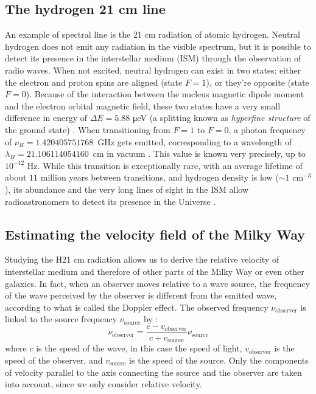 \subsection{The hydrogen 21 cm line}
An example of spectral line is the 21 cm radiation of atomic hydrogen.
Neutral hydrogen does not emit any radiation in the visible spectrum, but it is possible to detect its presence in the interstellar medium (ISM) through the observation of radio waves.
When not excited, neutral hydrogen can exist in two states: either the electron and proton spins are aligned (state $F=1$), or they're opposite (state $F=0$).
Because of the interaction between the nucleus magnetic dipole moment and the electron orbital magnetic field, these two states have a very small difference in energy of $\Delta E = 5.88$ \si{\micro\electronvolt} (a splitting known as \emph{hyperfine structure} of the ground state) \cite{lauterbach_radio_2022}.
When transitioning from $F=1$ to $F=0$, a photon frequency of \mbox{$\nu_H = 1.420405751768$ GHz} gets emitted, corresponding to a wavelength of \mbox{$\lambda_H = 21.106114054160$ cm} in vacuum \cite{hellwig_measurement_1970}. This value is known very precisely, up to $10^{-12}$ Hz.
While this transition is exceptionally rare, with an average lifetime of about $11$ million years between transitions, and hydrogen density is low ($\sim 1$ cm$^{-3}$), its abundance and the very long lines of sight in the ISM allow radioastronomers to detect its presence in the Universe \cite{burke_introduction_2013}.

\subsection{Estimating the velocity field of the Milky Way}
Studying the H21 cm radiation allows us to derive the relative velocity of interstellar medium and therefore of other parts of the Milky Way or even other galaxies.
In fact, when an observer moves relative to a wave source, the frequency of the wave perceived by the observer is different from the emitted wave, according to what is called the Doppler effect.
The observed frequency $\nu_\textrm{observer}$ is linked to the source frequency $\nu_\textrm{source}$ by \cite{alonso_fundamental_1983}:
\begin{equation}
    \nu_\textrm{observer} = \frac{c - v_\textrm{observer}}{c + v_\textrm{source}} \nu_\textrm{source}
    \label{eq:doppler_general}
\end{equation}
where $c$ is the speed of the wave, in this case the speed of light, $v_\textrm{observer}$ is the speed of the observer, and $v_\textrm{source}$ is the speed of the source.
Only the components of velocity parallel to the axis connecting the source and the observer are taken into account, since we only consider relative velocity.


